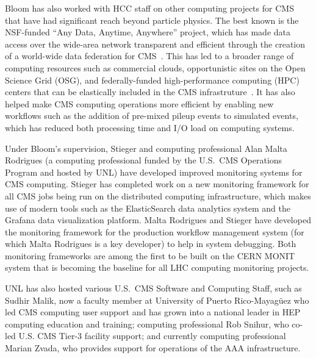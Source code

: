 Bloom has also worked with HCC staff on other computing projects for CMS
that have had significant reach beyond particle physics.  The best known is
the NSF-funded ``Any Data, Anytime, Anywhere'' project, which has made data
access over the wide-area network transparent and efficient through the
creation of a world-wide data federation for CMS~\cite{bib:AAA}.  This has led to a
broader range of computing resources such as commercial clouds,
opportunistic sites on the Open Science Grid (OSG), and federally-funded
high-performance computing (HPC) centers that can be elastically included
in the CMS infrastruture~\cite{bib:hepcloud}.  It has also helped make CMS
computing operations more efficient by enabling new workflows such as the
addition of pre-mixed pileup events to simulated events, which has reduced
both processing time and I/O load on computing systems.

Under Bloom's supervision, Stieger and computing professional Alan Malta
Rodrigues (a computing professional funded by the U.S.~CMS Operations
Program and hosted by UNL) have developed improved monitoring systems for
CMS computing. Stieger has completed work on a new monitoring framework for
all CMS jobs being run on the distributed computing infrastructure, which
makes use of modern tools such as the ElasticSearch data analytics system
and the Grafana data visualization platform. Malta Rodrigues and Stieger
have developed the monitoring framework for the production workflow
management system (for which Malta Rodrigues is a key developer) to help in
system debugging.  Both monitoring frameworks are among the first to be
built on the CERN MONIT system that is becoming the baseline for all LHC
computing monitoring projects.

UNL has also hosted various U.S.~CMS Software and Computing Staff, such as
Sudhir Malik, now a faculty member at University of Puerto
Rico-Mayag{\"u}ez who led CMS computing user support and has grown into a
national leader in HEP computing education and training; computing
professional Rob Snihur, who co-led U.S. CMS Tier-3 facility support; and
currently computing professional Marian Zvada, who provides support for
operations of the AAA infrastructure.

